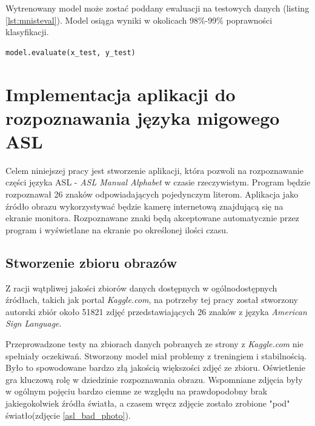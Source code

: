 \documentclass[a4paper,12pt,oneside]{book} %
\begin{document}
Wytrenowany model może zostać poddany ewaluacji na testowych danych (listing \ref{lst:mnisteval}). Model osiąga wyniki w okolicach 98\%-99\% poprawności klasyfikacji\cite{mnistapp}. 

\begin{lstlisting}[language=Python, caption={Ewaluacja modelu\cite{mnistapp}}, label={lst:mnisteval}]
	model.evaluate(x_test, y_test)
\end{lstlisting}


\chapter{Implementacja aplikacji do rozpoznawania języka migowego ASL}

Celem niniejszej pracy jest stworzenie aplikacji, która pozwoli na rozpoznawanie części języka ASL - \emph{ASL Manual Alphabet} w czasie rzeczywistym. Program będzie rozpoznawał 26 znaków odpowiadających pojedynczym literom. Aplikacja jako źródło obrazu wykorzystywać będzie kamerę internetową znajdującą się na ekranie monitora. Rozpoznawane znaki będą akceptowane automatycznie przez program i wyświetlane na ekranie po określonej ilości czasu.

\section{Stworzenie zbioru obrazów}

Z racji wątpliwej jakości zbiorów danych dostępnych w ogólnodostępnych źródłach, takich jak portal \emph{Kaggle.com}, na potrzeby tej pracy został stworzony autorski zbiór około 51821 zdjęć przedstawiających 26 znaków z języka \emph{American Sign Language}.

Przeprowadzone testy na zbiorach danych pobranych ze strony z \emph{Kaggle.com} nie spełniały oczekiwań. Stworzony model miał problemy z treningiem i stabilnością. Było to spowodowane bardzo złą jakością większości zdjęć ze zbioru. Oświetlenie gra kluczową rolę w dziedzinie rozpoznawania obrazu. Wspomniane zdjęcia były w ogólnym pojęciu bardzo ciemne ze względu na prawdopodobny brak jakiegokolwiek źródła światła, a czasem wręcz zdjęcie zostało zrobione "pod" światło(zdjęcie \ref{asl_bad_photo}). 
\end{document}
